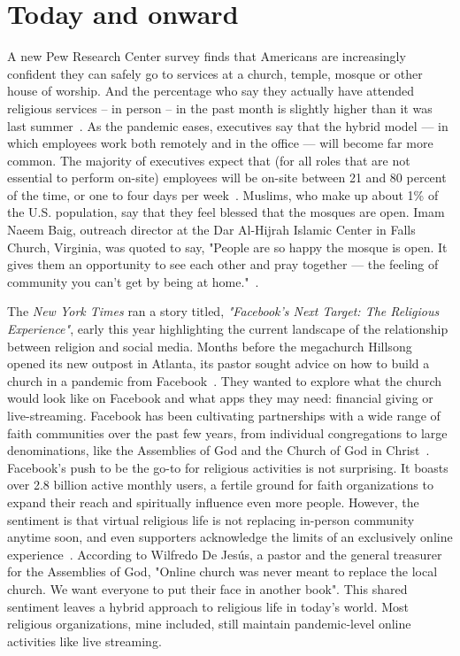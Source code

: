 \section{Today and onward}
A new Pew Research Center survey finds that Americans are increasingly confident they can safely go to services at a church, temple, mosque or other house of worship. And the percentage who say they actually have attended religious services – in person – in the past month is slightly higher than it was last summer~\cite{smith}. As the pandemic eases, executives say that the hybrid model — in which employees work both remotely and in the office — will become far more common. The majority of executives expect that (for all roles that are not essential to perform on-site) employees will be on-site between 21 and 80 percent of the time, or one to four days per week~\cite{andrea:alexander}. Muslims, who make up about 1\% of the U.S. population, say that they feel blessed that the mosques are open. Imam Naeem Baig, outreach director at the Dar Al-Hijrah Islamic Center in Falls Church, Virginia, was quoted to say, "People are so happy the mosque is open. It gives them an opportunity to see each other and pray together — the feeling of community you can’t get by being at home."~\cite{block}.

The \textit{New York Times} ran a story titled, \textit{"Facebook's Next Target: The Religious Experience"}, early this year highlighting the current landscape of the relationship between religion and social media. Months before the megachurch Hillsong opened its new outpost in Atlanta, its pastor sought advice on how to build a church in a pandemic from Facebook~\cite{colleran}. They wanted to explore what the church would look like on Facebook and what apps they may need: financial giving or live-streaming. Facebook has been cultivating partnerships with a wide range of faith communities over the past few years, from individual congregations to large denominations, like the Assemblies of God and the Church of God in Christ~\cite{colleran}. Facebook's push to be the go-to for religious activities is not surprising. It boasts over 2.8 billion active monthly users, a fertile ground for faith organizations to expand their reach and spiritually influence even more people. However, the sentiment is that virtual religious life is not replacing in-person community anytime soon, and even supporters acknowledge the limits of an exclusively online experience~\cite{colleran}. According to Wilfredo De Jesús, a pastor and the general treasurer for the Assemblies of God, "Online church was never meant to replace the local church. We want everyone to put their face in another book".  This shared sentiment leaves a hybrid approach to religious life in today's world. Most religious organizations, mine included, still maintain pandemic-level online activities like live streaming.

